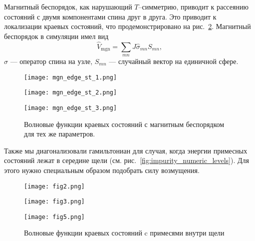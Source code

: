Магнитный беспорядок, как нарушающий $T$--симметрию, приводит к рассеянию состояний
с двумя компонентами спина друг в друга. Это приводит к локализации краевых состояний,
что продемонстрировано на рис.~\ref{fig:magnetic_disorder}.  Магнитный беспорядок 
в симуляции имел вид
\begin{equation}
    \hat{V}_{\mathrm{mgn}} = \sum_{mn} J \hat{\sigma}_{mn} S_{mn},
\end{equation}
$\hat{\sigma}$ --- оператор спина на узле, $S_{mn}$ --- случайный вектор на единичной сфере.
\begin{figure}[h]
    \centering
    \begin{minipage}[h]{0.9\linewidth}
        \centering
        \texttt{[image: mgn\_edge\_st\_1.png]}
    \end{minipage}
    \vfill
    \begin{minipage}[h]{0.9\linewidth}
        \centering
        \texttt{[image: mgn\_edge\_st\_2.png]}
    \end{minipage}
    \vfill
    \begin{minipage}[h]{0.9\linewidth}
        \centering
        \texttt{[image: mgn\_edge\_st\_3.png]}
    \end{minipage}
    \caption{
        Волновые функции краевых состояний с магнитным беспорядком 
        для тех же параметров.
        }
    \label{fig:magnetic_disorder}
\end{figure}

Также мы диагонализовали гамильтониан для случая, когда энергии примесных состояний
лежат в середине щели (см. рис.~\ref{fig:impurity_numeric_levels}). Для этого нужно
специальным образом подобрать силу возмущения.

\begin{figure}[h]
    \centering
    \begin{minipage}[h]{0.9\linewidth}
        \centering
        \texttt{[image: fig2.png]}
    \end{minipage}
    \vfill
    \begin{minipage}[h]{0.9\linewidth}
        \centering
        \texttt{[image: fig3.png]}
    \end{minipage}
    \vfill
    \begin{minipage}[h]{0.9\linewidth}
        \centering
        \texttt{[image: fig5.png]}
    \end{minipage}
    \caption{
        Волновые функции краевых состояний c примесями внутри щели      
    }

    \label{fig:magnetic_disorder}
\end{figure}
